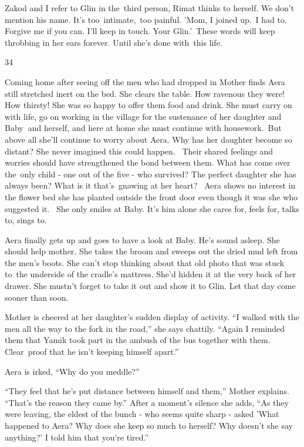 \documentclass[twoside,11pt]{book}
\begin{document}
Zakod and I refer to Glin in the\ third person, Rimat thinks to herself. We don't mention his name. It{}'s
too\ intimate,~too painful. {}'Mom, I joined up.\ I had to. Forgive me if you can. I{}'ll keep in touch. Your
Glin.{}'\ These words will keep throbbing in her ears forever. Until she{}'s done with\ this life.


\bigskip

34 \ 

Coming home after seeing off the men who had dropped in Mother finds Aera still stretched inert on the bed. She clears
the table. How ravenous they were! How thirsty! She was so happy to offer them food and drink. She must carry on with
life, go on working in the village for the sustenance of her daughter and Baby\textbf{\ }and herself, and here at home
she must continue with housework.{\ }But above all she'll continue to worry about Aera. Why has her
daughter become so distant? She never imagined this could happen. ~Their shared feelings and worries should have
strengthened the bond between them. What has come over the~only child - one out of the five - who survived? The perfect
daughter she has always been? What is it that's~gnawing at her heart? ~Aera shows no interest in the flower bed she has
planted outside the front door even though it was she who suggested it. ~She only smiles at Baby. It's him alone she
cares for, feels for, talks to, sings to.\ 

Aera finally gets up and goes to have a look at Baby. He's sound asleep. She should help mother. She takes the broom and
sweeps out the dried mud left from the men's boots. She can't stop thinking about that old photo that was stuck
to{\ }the underside of the cradle's mattress. She'd hidden it at the very back of her drawer. She
mustn't forget to take it out and show it to Glin. Let that day come sooner than soon. 

Mother is cheered at her daughter's sudden display of activity. ``I walked with the men all the way to the
fork in the road,'' she says chattily. ``Again I reminded them that Yamik took part in the
ambush of the bus together with them.  Clear~proof that he isn't keeping himself apart.''

Aera is irked, ``Why do you meddle?'' 

``They feel that he{}'s put distance between himself and them,'' Mother explains.
``That's the reason they came by.'' After a moment's silence she adds, ``As they
were leaving, the eldest of the bunch - who seems quite sharp - asked 'What happened to Aera? Why does she keep so much
to herself? Why doesn't she say anything?' I told him that you're tired.'' 
\end{document}
